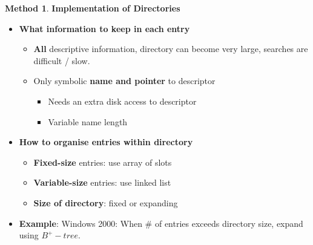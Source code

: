 \documentclass[11pt,a4paper]{article}
\theoremstyle{definition}
\newtheorem{method}{Method}[section]
\newenvironment{myitemize}
{ \begin{itemize}
    \setlength{\itemsep}{5pt}
    \setlength{\parskip}{0pt}
    \setlength{\parsep}{0pt}     }
{ \end{itemize}                  }
\begin{document}
\begin{minipage}{0.45\linewidth}
	\begin{method}{\textbf{Implementation of Directories}}
		\begin{myitemize} 
		\item \textbf{What information to keep in each entry}
		\begin{myitemize}
			\item \textbf{All} descriptive information, directory can become very large, searches are difficult / slow.
			\item Only symbolic \textbf{name and pointer} to descriptor
			\begin{myitemize}
				\item Needs an extra disk access to descriptor
				\item Variable name length
			\end{myitemize}
		\end{myitemize}
		\item \textbf{How to organise entries within directory}
		\begin{myitemize}
			\item \textbf{Fixed-size} entries: use array of slots
			\item \textbf{Variable-size} entries: use linked list
			\item \textbf{Size of directory}: fixed or expanding
		\end{myitemize}
		\item \textbf{Example}: Windows 2000: When \# of entries exceeds directory size, expand using $B^{+}-tree$.
	\end{myitemize}
	\end{method}
	\end{minipage}\hspace{5mm}
\end{document}
